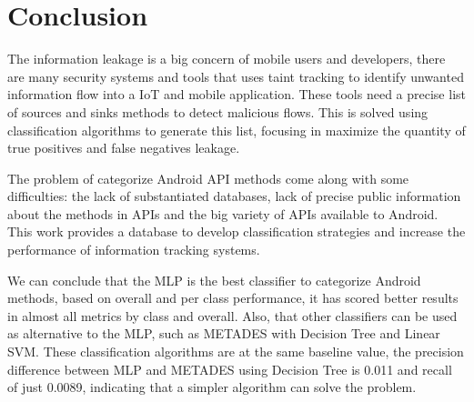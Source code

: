 \chapter{Conclusion}

The information leakage is a big concern of mobile users and developers, there are many security systems and tools that uses taint tracking to identify unwanted information flow into a IoT and mobile application. These tools need a precise list of sources and sinks methods to detect malicious flows. This is solved using classification algorithms to generate this list, focusing in maximize the quantity of true positives and false negatives leakage.

The problem of categorize Android API methods come along with some difficulties: the lack of substantiated databases, lack of precise public information about the methods in APIs and the big variety of APIs available to Android. This work provides a database to develop classification strategies and increase the performance of information tracking systems.

We can conclude that the MLP is the best classifier to categorize Android methods, based on overall and per class performance, it has scored better results in almost all metrics by class and overall. Also, that other classifiers can be used as alternative to the MLP, such as METADES with Decision Tree and Linear SVM. These classification algorithms are at the same baseline value, the precision difference between MLP and METADES using Decision Tree is 0.011 and recall of just 0.0089, indicating that a simpler algorithm can solve the problem.
